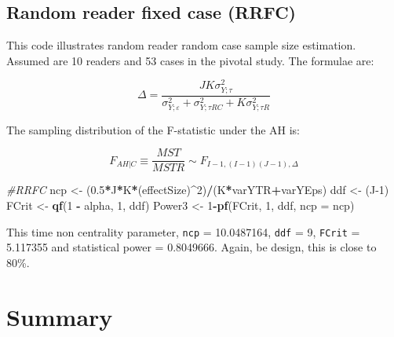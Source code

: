 \documentclass[
]{book}
\newenvironment{Shaded}{\begin{snugshade}}{\end{snugshade}}
\newcommand{\CommentTok}[1]{\textcolor[rgb]{0.56,0.35,0.01}{\textit{#1}}}
\newcommand{\DataTypeTok}[1]{\textcolor[rgb]{0.13,0.29,0.53}{#1}}
\newcommand{\DecValTok}[1]{\textcolor[rgb]{0.00,0.00,0.81}{#1}}
\newcommand{\FloatTok}[1]{\textcolor[rgb]{0.00,0.00,0.81}{#1}}
\newcommand{\KeywordTok}[1]{\textcolor[rgb]{0.13,0.29,0.53}{\textbf{#1}}}
\newcommand{\NormalTok}[1]{#1}
\newcommand{\OperatorTok}[1]{\textcolor[rgb]{0.81,0.36,0.00}{\textbf{#1}}}
\newcommand{\StringTok}[1]{\textcolor[rgb]{0.31,0.60,0.02}{#1}}
\begin{document}
\hypertarget{random-reader-fixed-case-rrfc}{%
\subsection{Random reader fixed case (RRFC)}\label{random-reader-fixed-case-rrfc}}

This code illustrates random reader random case sample size estimation. Assumed are 10 readers and 53 cases in the pivotal study. The formulae are:

\begin{equation*} 
\Delta =\frac{JK\sigma _{Y;\tau }^{2}}{\sigma _{Y;\varepsilon }^{2}+\sigma _{Y;\tau RC}^{2}+K\sigma _{Y;\tau R}^{2}}
\end{equation*}

The sampling distribution of the F-statistic under the AH is:

\begin{equation*} 
{{F}_{\left. AH \right|C}}\equiv \frac{MST}{MSTR}\sim{{F}_{I-1,\left( I-1 \right)\left( J-1 \right),\Delta }}
\end{equation*}

\begin{Shaded}
\begin{Highlighting}[]
\CommentTok{\#RRFC}
\NormalTok{ncp \textless{}{-}}\StringTok{ }\NormalTok{(}\FloatTok{0.5}\OperatorTok{*}\NormalTok{J}\OperatorTok{*}\NormalTok{K}\OperatorTok{*}\NormalTok{(effectSize)}\OperatorTok{\^{}}\DecValTok{2}\NormalTok{)}\OperatorTok{/}\NormalTok{(K}\OperatorTok{*}\NormalTok{varYTR}\OperatorTok{+}\NormalTok{varYEps)}
\NormalTok{ddf \textless{}{-}}\StringTok{ }\NormalTok{(J}\DecValTok{{-}1}\NormalTok{)}
\NormalTok{FCrit \textless{}{-}}\StringTok{ }\KeywordTok{qf}\NormalTok{(}\DecValTok{1} \OperatorTok{{-}}\StringTok{ }\NormalTok{alpha, }\DecValTok{1}\NormalTok{, ddf)}
\NormalTok{Power3 \textless{}{-}}\StringTok{ }\DecValTok{1}\OperatorTok{{-}}\KeywordTok{pf}\NormalTok{(FCrit, }\DecValTok{1}\NormalTok{, ddf, }\DataTypeTok{ncp =}\NormalTok{ ncp)}
\end{Highlighting}
\end{Shaded}

This time non centrality parameter, \texttt{ncp} = 10.0487164, \texttt{ddf} = 9, \texttt{FCrit} = 5.117355 and statistical power = 0.8049666. Again, be design, this is close to 80\%.

\hypertarget{summary-2}{%
\section{Summary}\label{summary-2}}
\end{document}

